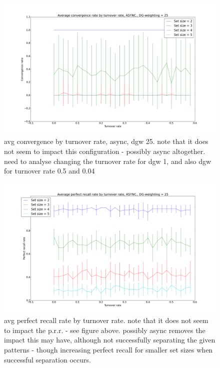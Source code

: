 \begin{figure}[h!]
    \centering
    \includegraphics[width=13cm]{fig/avg_convergence_by_turnover_rate_async_dgw_25.png}
    \caption{avg convergence by turnover rate, async, dgw 25. note that it does not seem to impact this configuration - possibly async altogether. need to analyse changing the turnover rate for dgw 1, and also dgw for turnover rate 0.5 and 0.04}
    \label{fig:avg_convergence_by_turnover_rate_async_dgw_25}
\end{figure}

\begin{figure}[h!]
    \centering
    \includegraphics[width=13cm]{fig/avg_perfect_recall_rate_by_turnover_rate_async_dgw_25.png}
    \caption{avg perfect recall rate by turnover rate. note that it does not seem to impact the p.r.r. - see figure above. possibly async removes the impact this may have, although not successfully separating the given patterns - though increasing perfect recall for smaller set sizes when successful separation occurs.}
    \label{fig:avg_perfect_recall_rate_by_turnover_rate_async_dgw_25}
\end{figure}

